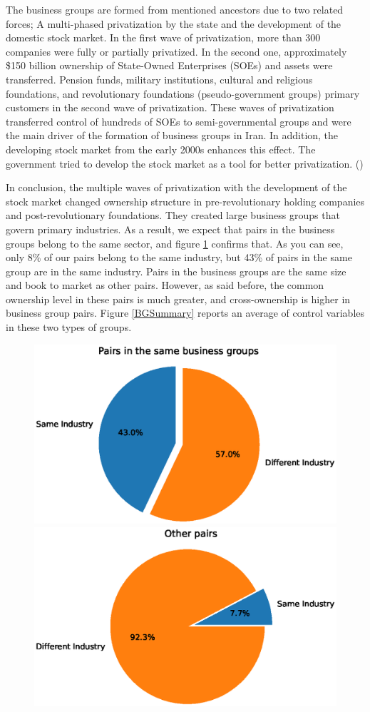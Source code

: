 \documentclass[12pt, a4paper]{article}
\begin{document}
The business groups are formed from mentioned ancestors due to two related forces; A multi-phased privatization by the state and the development of the domestic stock market. In the first wave of privatization, more than 300 companies were fully or partially privatized. In the second one, approximately  \$150 billion ownership of State-Owned Enterprises (SOEs) and assets were transferred.  
Pension funds, military institutions, cultural and religious foundations, and revolutionary foundations (pseudo-government groups) primary customers in the second wave of privatization. These waves of privatization transferred control of hundreds of SOEs to
semi-governmental groups and were the main driver of the formation of business groups in Iran. In addition, the developing stock market from the early 2000s enhances this effect. The government tried to develop the stock market as a tool for better privatization. 
(\cite{Aliabadi2022})

In conclusion, the multiple waves of privatization with the development of the stock market changed ownership structure in pre-revolutionary holding companies and post-revolutionary foundations. They created large business groups that govern primary industries. As a result, we expect that pairs in the business groups belong to the same sector, and figure \ref{sameIndustryinBG} confirms that. As you can see, only 8\% of our pairs belong to the same industry, but 43\% of pairs in the same group are in the same industry. Pairs in the business groups are the same size and book to market as other pairs. However, as said before, the common ownership level in these pairs is much greater, and cross-ownership is higher in business group pairs. Figure \ref{BGSummary} reports an average of control variables in these two types of groups.


\begin{figure}[htbp]
	\caption{}
	\label{sameIndustryinBG}
	\centering
	\includegraphics[width=0.48\linewidth]{sameIndustryinBG.eps}
	\includegraphics[width=0.48\linewidth]{sameIndustryNoinBG.eps}
\end{figure}
\end{document}

